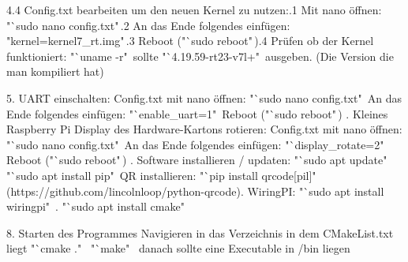 \documentclass[12pt,a4paper,bibliography=totoc,listof=totoc]{scrartcl}
\begin{document}
4.4 Config.txt bearbeiten um den neuen Kernel zu nutzen:.1 Mit nano öffnen: "`sudo nano config.txt"\,.2 An das Ende folgendes einfügen: "kernel=kernel7\_rt.img"\,.3 Reboot ("`sudo reboot"\,).4 Prüfen ob der Kernel funktioniert: "`uname -r" \,sollte "`4.19.59-rt23-v7l+"\, ausgeben. 
      (Die Version die man kompiliert hat)\newline
\newline

5. UART einschalten: Config.txt mit nano öffnen: "`sudo nano config.txt"\, An das Ende folgendes einfügen: "`enable\_uart=1"\, Reboot ("`sudo reboot"\,)\newline
{}. Kleines Raspberry Pi Display des Hardware-Kartons rotieren: Config.txt mit nano öffnen: "`sudo nano config.txt"\, An das Ende folgendes einfügen: "`display\_rotate=2"\, Reboot ("`sudo reboot"\,)\newline
{}. Software installieren / updaten: "`sudo apt update"\, "`sudo apt install pip"\, QR installieren: "`pip install qrcode[pil]"\,
    (https://github.com/lincolnloop/python-qrcode). WiringPI: "`sudo apt install wiringpi"\ . "`sudo apt install cmake"\ \newline

8. Starten des Programmes  Navigieren in das Verzeichnis in dem CMakeList.txt liegt  "`cmake ."\  "`make"\  danach sollte eine Executable in /bin liegen 
\end{document}
